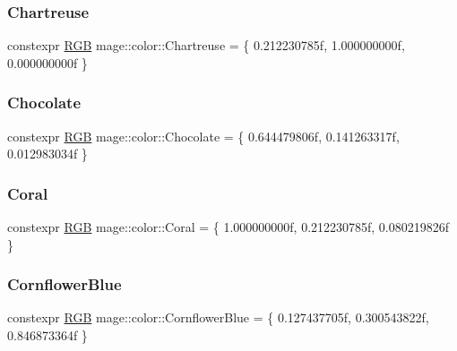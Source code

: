 \subsubsection{\texorpdfstring{Chartreuse}{Chartreuse}}
{\footnotesize\ttfamily constexpr \hyperlink{structmage_1_1_r_g_b}{R\+GB} mage\+::color\+::\+Chartreuse = \{ 0.\+212230785f, 1.\+000000000f, 0.\+000000000f \}}

\hypertarget{namespacemage_1_1color_a19707250aad8c877717355fac97779d6}{}\label{namespacemage_1_1color_a19707250aad8c877717355fac97779d6} 
\subsubsection{\texorpdfstring{Chocolate}{Chocolate}}
{\footnotesize\ttfamily constexpr \hyperlink{structmage_1_1_r_g_b}{R\+GB} mage\+::color\+::\+Chocolate = \{ 0.\+644479806f, 0.\+141263317f, 0.\+012983034f \}}

\hypertarget{namespacemage_1_1color_a01bc4f2d453366cf9af890f0abb94738}{}\label{namespacemage_1_1color_a01bc4f2d453366cf9af890f0abb94738} 
\subsubsection{\texorpdfstring{Coral}{Coral}}
{\footnotesize\ttfamily constexpr \hyperlink{structmage_1_1_r_g_b}{R\+GB} mage\+::color\+::\+Coral = \{ 1.\+000000000f, 0.\+212230785f, 0.\+080219826f \}}

\hypertarget{namespacemage_1_1color_a6b4ca119db23d03d1c5bc912c87b6348}{}\label{namespacemage_1_1color_a6b4ca119db23d03d1c5bc912c87b6348} 
\subsubsection{\texorpdfstring{Cornflower\+Blue}{CornflowerBlue}}
{\footnotesize\ttfamily constexpr \hyperlink{structmage_1_1_r_g_b}{R\+GB} mage\+::color\+::\+Cornflower\+Blue = \{ 0.\+127437705f, 0.\+300543822f, 0.\+846873364f \}}

\hypertarget{namespacemage_1_1color_ace73c8ed652093ab4cce3af40a8efe1a}{}\label{namespacemage_1_1color_ace73c8ed652093ab4cce3af40a8efe1a} 
